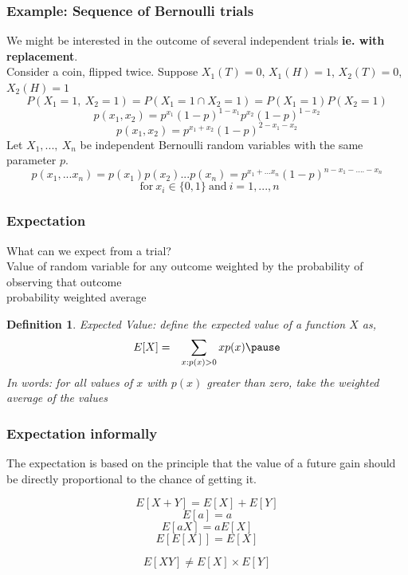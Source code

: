 \documentclass[handout]{beamer}
\newtheorem{defn}{Definition}
\numberwithin{equation}{section}
\begin{document}
\begin{frame}
\frametitle{Example: Sequence of Bernoulli trials}

We might be interested in the outcome of several independent trials \textbf{ie. with replacement}.\\
\pause
Consider a coin, flipped twice.  Suppose $X_1(T)=0$, $X_1(H)=1$, $X_2(T)=0$, $X_2(H)=1$  \pause
$$P(X_1=1,\ X_2=1)=P(X_1=1\cap X_2=1)= P(X_1=1)P(X_2=1) $$
\pause
$$p(x_1, x_2)= p^{x_1}(1-p)^{1-x_1}p^{x_2}(1-p)^{1-x_2}$$
\pause
$$p(x_1, x_2)= p^{x_1+x_2}(1-p)^{2- x_1- x_2}$$
\pause
Let $X_1,...,\ X_n$ be independent Bernoulli random variables with the same parameter $p$.
$$p(x_1,...x_n)=p(x_1)p(x_2)... p(x_n)= p^{x_1+...x_n}(1-p)^{n-x_1-....-x_n}$$
$$\ \ \text{for}\ x_i\in\{0,1\} \ \text{and}\ i=1,...,n$$

\end{frame}


\begin{frame}
\frametitle{Expectation}

What can we \alert{expect} from a trial? \pause \\

Value of random variable for any outcome weighted by the probability of observing that outcome \pause \\
probability weighted average \pause \\

\begin{defn} 
Expected Value: define the expected value of a function $X$ as, 
\begin{eqnarray}
E[X] &  = & \sum_{x:p(x)>0} x p(x) \nonumber \pause 
\end{eqnarray}
In words: for all values of $x$ with $p(x)$ greater than zero, take the weighted average of the values
\end{defn} 

\end{frame}


\begin{frame}
\frametitle{Expectation informally}

The expectation is based on the principle that the value of a future gain should be directly proportional to the chance of getting it.

$$E[X+Y]=E[X]+E[Y]$$
$$E[a]=a$$
$$E[aX]=aE[X]$$
$$E[E[X]]=E[X]$$

$$E[XY]\neq E[X]\times E[Y]$$

\end{frame}
\end{document}
